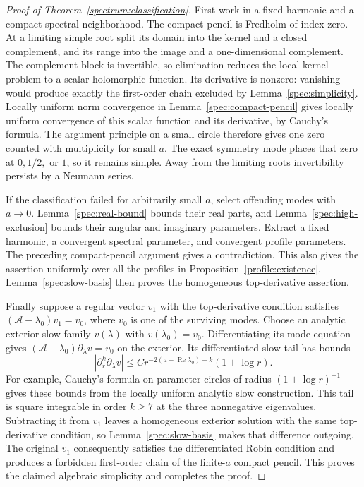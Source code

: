 \documentclass[11pt]{article}
\numberwithin{equation}{section}
\theoremstyle{definition}
\theoremstyle{remark}
\begin{document}
\begin{proof}[Proof of Theorem~\ref{spectrum:classification}]
First work in a fixed harmonic and a compact spectral neighborhood.
The compact pencil is Fredholm of index zero. At a limiting simple
root split its domain into the kernel and a closed complement, and
its range into the image and a one-dimensional complement. The
complement block is invertible, so elimination reduces the local
kernel problem to a scalar holomorphic function. Its derivative is
nonzero: vanishing would produce exactly the first-order chain
excluded by Lemma~\ref{spec:simplicity}. Locally uniform norm
convergence in Lemma~\ref{spec:compact-pencil} gives locally uniform
convergence of this scalar function and its derivative, by Cauchy's
formula. The argument principle on a small circle therefore gives
one zero counted with multiplicity for small $a$. The exact symmetry
mode places that zero at $0,1/2,$ or $1$, so it remains simple. Away
from the limiting roots invertibility persists by a Neumann series.

If the classification failed for arbitrarily small $a$, select
offending modes with $a\to0$. Lemma~\ref{spec:real-bound} bounds
their real parts, and Lemma~\ref{spec:high-exclusion} bounds their
angular and imaginary parameters. Extract a fixed harmonic, a
convergent spectral parameter, and convergent profile parameters.
The preceding compact-pencil argument gives a contradiction.
This also gives the assertion uniformly over all the profiles in
Proposition~\ref{profile:existence}. Lemma~\ref{spec:slow-basis}
then proves the homogeneous top-derivative assertion.

Finally suppose a regular vector $v_1$ with the top-derivative
condition satisfies $(\mathcal A-\lambda_0)v_1=v_0$, where $v_0$ is
one of the surviving modes. Choose an analytic exterior slow family
$v(\lambda)$ with $v(\lambda_0)=v_0$. Differentiating its mode
equation gives
$(\mathcal A-\lambda_0)\partial_\lambda v=v_0$ on the exterior.
Its differentiated slow tail has bounds
\[
 |\partial_r^k\partial_\lambda v|
 \le C r^{-2(a+\operatorname{Re}\lambda_0)-k}(1+\log r).
\]
For example, Cauchy's formula on parameter circles of radius
$(1+\log r)^{-1}$ gives these bounds from the locally uniform
analytic slow construction. This tail is square integrable in
order $k\ge7$ at the three nonnegative eigenvalues. Subtracting it
from $v_1$ leaves a homogeneous exterior solution with the same
top-derivative condition, so Lemma~\ref{spec:slow-basis} makes that
difference outgoing. The original $v_1$ consequently satisfies the
differentiated Robin condition and produces a forbidden first-order
chain of the finite-$a$ compact pencil. This proves the claimed
algebraic simplicity and completes the proof.
\end{proof}
\end{document}
